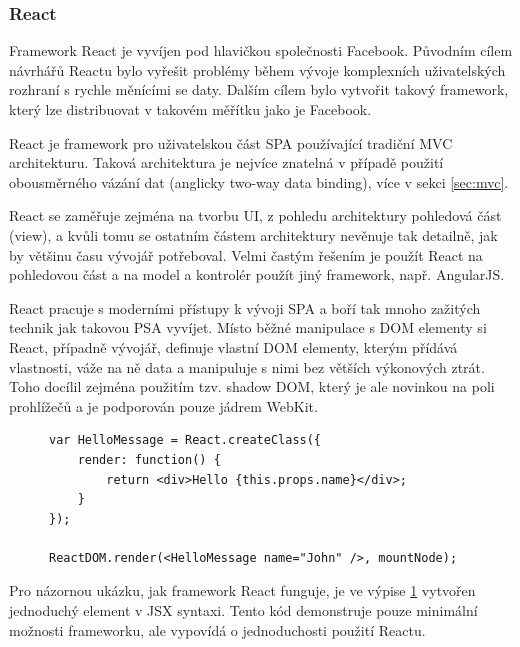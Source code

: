 \subsubsection*{React\cite{react}}
Framework React je vyvíjen pod hlavičkou společnosti Facebook. Původním cílem návrhářů Reactu bylo vyřešit problémy během vývoje komplexních uživatelských rozhraní s rychle měnícími se daty. Dalším cílem bylo vytvořit takový framework, který lze distribuovat v takovém měřítku jako je Facebook.

React je framework pro uživatelskou část SPA používající tradiční MVC architekturu. Taková architektura je nejvíce znatelná v případě použití obousměrného vázání dat (anglicky two-way data binding), více v sekci \ref{sec:mvc}.

React se zaměřuje zejména na tvorbu UI, z pohledu architektury pohledová část (view), a kvůli tomu se ostatním částem architektury nevěnuje tak detailně, jak by většinu času vývojář potřeboval. Velmi častým řešením je použít React na pohledovou část a na model a kontrolér použít jiný framework, např. AngularJS.

React pracuje s moderními přístupy k vývoji SPA a boří tak mnoho zažitých technik jak takovou PSA vyvíjet. Místo běžné manipulace s DOM elementy si React, případně vývojář, definuje vlastní DOM elementy, kterým přídává vlastnosti, váže na ně data a manipuluje s nimi bez větších výkonových ztrát. Toho docílil zejména použitím tzv. shadow DOM\cite{shadowdom}, který je ale novinkou na poli prohlížečů a je podporován pouze jádrem WebKit. 


\begin{figure}[ht]
\lstset{basicstyle=\small,style=JSON}
\begin{lstlisting}
var HelloMessage = React.createClass({
    render: function() {
        return <div>Hello {this.props.name}</div>;
    }
});

ReactDOM.render(<HelloMessage name="John" />, mountNode);
\end{lstlisting}
\label{code:react}
\end{figure}

Pro názornou ukázku, jak framework React funguje, je ve výpise \ref{code:react} vytvořen jednoduchý  element v JSX\cite{jsx} syntaxi. Tento kód demonstruje pouze minimální možnosti frameworku, ale vypovídá o jednoduchosti použití Reactu.

